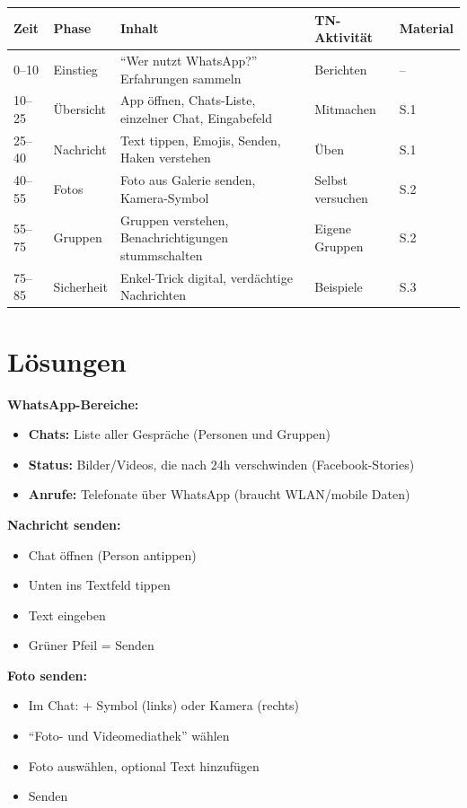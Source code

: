 \documentclass[11pt,a4paper]{article}
\begin{document}
\begin{longtable}{|p{1cm}|p{2cm}|p{5cm}|p{3cm}|p{2cm}|}
\hline
\textbf{Zeit} & \textbf{Phase} & \textbf{Inhalt} & \textbf{TN-Aktivität} & \textbf{Material} \\
\hline
0--10 & Einstieg & ``Wer nutzt WhatsApp?'' Erfahrungen sammeln & Berichten & -- \\
\hline
10--25 & Übersicht & App öffnen, Chats-Liste, einzelner Chat, Eingabefeld & Mitmachen & S.1 \\
\hline
25--40 & Nachricht & Text tippen, Emojis, Senden, Haken verstehen & Üben & S.1 \\
\hline
40--55 & Fotos & Foto aus Galerie senden, Kamera-Symbol & Selbst versuchen & S.2 \\
\hline
55--75 & Gruppen & Gruppen verstehen, Benachrichtigungen stummschalten & Eigene Gruppen & S.2 \\
\hline
75--85 & Sicherheit & Enkel-Trick digital, verdächtige Nachrichten & Beispiele & S.3 \\
\hline
\end{longtable}

\section{Lösungen}

\textbf{WhatsApp-Bereiche:}
\begin{itemize}
    \item \textbf{Chats:} Liste aller Gespräche (Personen und Gruppen)
    \item \textbf{Status:} Bilder/Videos, die nach 24h verschwinden (Facebook-Stories)
    \item \textbf{Anrufe:} Telefonate über WhatsApp (braucht WLAN/mobile Daten)
\end{itemize}

\textbf{Nachricht senden:}
\begin{itemize}
    \item Chat öffnen (Person antippen)
    \item Unten ins Textfeld tippen
    \item Text eingeben
    \item Grüner Pfeil = Senden
\end{itemize}

\textbf{Foto senden:}
\begin{itemize}
    \item Im Chat: + Symbol (links) oder Kamera (rechts)
    \item ``Foto- und Videomediathek'' wählen
    \item Foto auswählen, optional Text hinzufügen
    \item Senden
\end{itemize}
\end{document}
